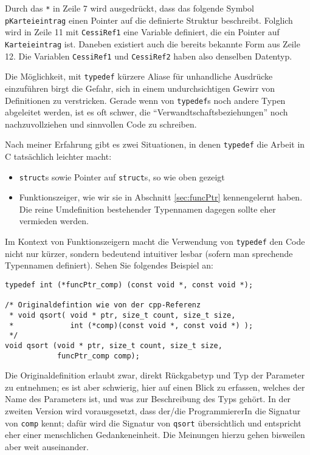 Durch das \texttt{*} in Zeile 7 wird ausgedrückt, dass das folgende Symbol \texttt{pKarteieintrag} einen Pointer auf die definierte Struktur beschreibt. Folglich wird in Zeile 11 mit \texttt{CessiRef1} eine Variable definiert, die ein Pointer auf \texttt{Karteieintrag} ist. Daneben existiert auch die bereits bekannte Form aus Zeile 12. Die Variablen \texttt{CessiRef1} und \texttt{CessiRef2} haben also denselben Datentyp.

\begin{hintbox}
Die Möglichkeit, mit \texttt{typedef} kürzere Aliase für unhandliche Ausdrücke einzuführen birgt die Gefahr, sich in einem undurchsichtigen Gewirr von Definitionen zu verstricken. Gerade wenn von \texttt{typedef}s noch andere Typen abgeleitet werden, ist es oft schwer, die \enquote{Verwandtschaftsbeziehungen} noch nachzuvollziehen und sinnvollen Code zu schreiben.

Nach meiner Erfahrung gibt es zwei Situationen, in denen \texttt{typedef} die Arbeit in C tatsächlich leichter macht:
\begin{itemize}
\item \texttt{struct}s sowie Pointer auf \texttt{struct}s, so wie oben gezeigt
\item Funktionszeiger, wie wir sie in Abschnitt \ref{sec:funcPtr} kennengelernt haben.
Die reine Umdefinition bestehender Typennamen dagegen sollte eher vermieden werden.
\end{itemize}
\end{hintbox}

\begin{hintbox}[]
Im Kontext von Funktionszeigern macht die Verwendung von \texttt{typedef} den Code nicht nur kürzer, sondern bedeutend intuitiver lesbar (sofern man sprechende Typennamen definiert). Sehen Sie folgendes Beispiel an:

\begin{codebox}
\begin{verbatim}
typedef int (*funcPtr_comp) (const void *, const void *);

/* Originaldefintion wie von der cpp-Referenz
 * void qsort( void * ptr, size_t count, size_t size,
 *             int (*comp)(const void *, const void *) );
 */
void qsort (void * ptr, size_t count, size_t size,
            funcPtr_comp comp);
\end{verbatim}
\end{codebox}
Die Originaldefinition erlaubt zwar, direkt Rückgabetyp und Typ der Parameter zu entnehmen; es ist aber schwierig, hier auf einen Blick zu erfassen, welches der Name des Parameters ist, und was zur Beschreibung des Typs gehört. In der zweiten Version wird vorausgesetzt, dass der/die ProgrammiererIn die Signatur von \texttt{comp} kennt; dafür wird die Signatur von \texttt{qsort} übersichtlich und entspricht eher einer menschlichen Gedankeneinheit. Die Meinungen hierzu gehen bisweilen aber weit auseinander.
\end{hintbox}


